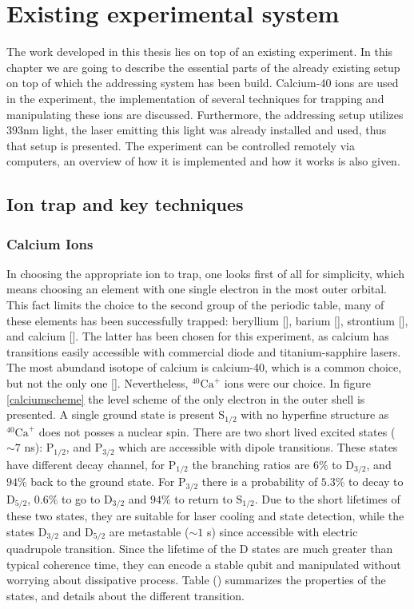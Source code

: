 
\chapter{Existing experimental system}
The work developed in this thesis lies on top of an existing experiment. In this chapter we are going to describe the essential parts of the already existing setup on top of which the addressing system has been build. Calcium-40 ions are used in the experiment, the implementation of several techniques for
trapping and manipulating these ions are discussed. Furthermore, the addressing setup utilizes 393nm light, the laser emitting this light was already installed and used, thus that setup is presented. The experiment can be controlled remotely via computers, an overview of how it is implemented and how it works is also given.

\section{Ion trap and key techniques}
\subsection{Calcium Ions}
In choosing the appropriate ion to trap, one looks first of all for simplicity, which means choosing an element with one single electron in the most outer orbital.
This fact limits the choice to the second group of the periodic table, many of these elements has been successfully trapped: beryllium [], barium [], strontium [], and calcium [].
The latter has been chosen for this experiment, as calcium has transitions easily accessible with commercial diode and titanium-sapphire lasers. The most abundand isotope of calcium is calcium-40, which is a common choice, but not the only one []. Nevertheless, $^{40}\text{Ca}^+$ ions were our choice. In figure \ref{calciumscheme} the level scheme of the only electron in the outer shell is presented. A single ground state is present $\text{S}_{1/2}$ with no hyperfine structure as $^{40}\text{Ca}^+$ does not posses a nuclear spin. There are two short lived excited states ($\sim 7$ ns): $\text{P}_{1/2}$, and $\text{P}_{3/2}$ which are accessible with dipole transitions. These states have different decay channel, for $\text{P}_{1/2}$
the branching ratios are $6\%$ to $\text{D}_{3/2}$, and $94\%$ back to the ground state. For  $\text{P}_{3/2}$ there is a probability of $5.3\%$ to decay to   $\text{D}_{5/2}$, $0.6\%$ to go to  $\text{D}_{3/2}$ and $94\%$ to return to  $\text{S}_{1/2}$. Due to the short lifetimes of these two states, they are suitable for laser cooling and state detection, while the states $\text{D}_{3/2}$ and $\text{D}_{5/2}$
are metastable ($\sim 1$ s) since accessible with electric quadrupole transition. Since the lifetime of the D states are much greater than typical coherence time, they can encode a stable qubit and manipulated without worrying about dissipative process. Table () summarizes the properties of the states, and details about the different transition.


